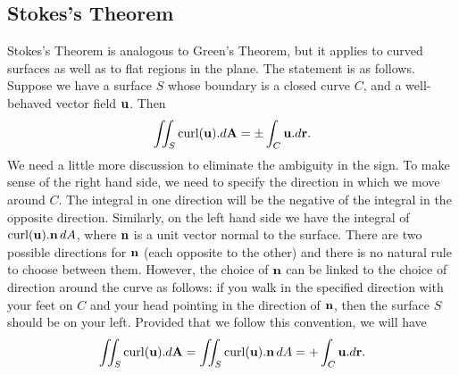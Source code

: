 \documentclass[reqno]{amsart}
\theoremstyle{definition}
\begin{document}
\subsection{Stokes's Theorem}

Stokes's Theorem is analogous to Green's Theorem, but it applies to
curved surfaces as well as to flat regions in the plane.  The
statement is as follows.  Suppose we have a surface $S$ whose boundary
is a closed curve $C$, and a well-behaved vector field $\mathbf{u}$.  Then 
\[ \iint_S \operatorname{curl}(\mathbf{u}).d\mathbf{A} = \pm \int_C\mathbf{u}.d\mathbf{r}. \]
We need a little more discussion to eliminate the ambiguity in the
sign.  To make sense of the right hand side, we need to specify the
direction in which we move around $C$.  The integral in one direction
will be the negative of the integral in the opposite direction.
Similarly, on the left hand side we have the integral of
$\operatorname{curl}(\mathbf{u}).\mathbf{n}\,dA$, where $\mathbf{n}$ is a unit vector normal to the
surface.  There are two possible directions for $\mathbf{n}$ (each opposite
to the other) and there is no natural rule to choose between them.
However, the choice of $\mathbf{n}$ can be linked to the choice of direction
around the curve as follows: if you walk in the specified direction
with your feet on $C$ and your head pointing in the direction of
$\mathbf{n}$, then the surface $S$ should be on your left.  Provided that we
follow this convention, we will have 
\[ \iint_S \operatorname{curl}(\mathbf{u}).d\mathbf{A} =
   \iint_S \operatorname{curl}(\mathbf{u}).\mathbf{n}\, dA =
   +\int_C\mathbf{u}.d\mathbf{r}. 
\]
\end{document}
